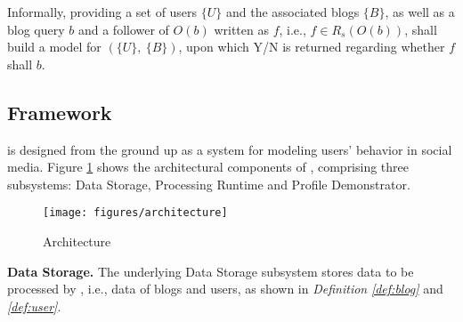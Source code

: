 Informally, providing a set of users $\{U\}$ and the associated blogs $\{B\}$, as well as a blog query $b$ and a follower of $O(b)$ written as $f$, i.e., $f \in R_s(O(b))$, \sys{} shall build a \retg{} model for $(\{U\},\ \{B\})$, upon which Y/N is returned regarding whether $f$ shall \ret{} $b$.


\subsection{\sys{} Framework}
\sys{} is designed from the ground up as a system for modeling users' \retg{} behavior in social media.
Figure \ref{fig:framework} shows the architectural components of \sys{}, comprising three subsystems: Data Storage, Processing Runtime and Profile Demonstrator.
 
\begin{figure}[!htb]
\centering
\texttt{[image: figures/architecture]}
\caption{\sys{} Architecture}
\label{fig:framework}
\end{figure}


\begin{comment}
\begin{figure}[!htb]
\centering
\texttt{[image: figures/microblog]}
\caption{Blog Data in \sys{}}
\label{fig:blog}
\end{figure}
\end{comment}

\begin{comment}
\begin{figure}[!htb]
\centering
\texttt{[image: figures/user]}
\caption{User Data in \sys{}}
\label{fig:user}
\end{figure}
\end{comment}


\textbf{Data Storage.} The underlying Data Storage subsystem stores data to be processed by \sys{}, i.e., data of blogs and users, as shown in \textit{Definition} \textit{\ref{def:blog}} and \textit{\ref{def:user}}.

